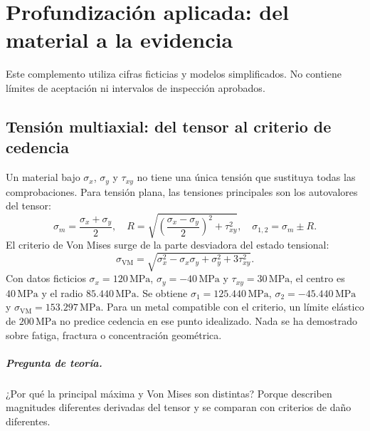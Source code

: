 \chapter{Profundización aplicada: del material a la evidencia}
\label{ch:matmo-profundizacion}
\noindent Este complemento utiliza cifras ficticias y modelos simplificados. No contiene límites de aceptación ni intervalos de inspección aprobados.

\section{Tensión multiaxial: del tensor al criterio de cedencia}
Un material bajo $\sigma_x$, $\sigma_y$ y $\tau_{xy}$ no tiene una única tensión que sustituya todas las comprobaciones. Para tensión plana, las tensiones principales son los autovalores del tensor:
\begin{equation}
\sigma_m=\frac{\sigma_x+\sigma_y}{2},\quad
R=\sqrt{\left(\frac{\sigma_x-\sigma_y}{2}\right)^2+\tau_{xy}^2},\quad
\sigma_{1,2}=\sigma_m\pm R.
\label{eq:av-matmo-mohr}
\end{equation}
El criterio de Von Mises surge de la parte desviadora del estado tensional:
\begin{equation}
\sigma_{\mathrm{VM}}=\sqrt{\sigma_x^2-\sigma_x\sigma_y+\sigma_y^2+3\tau_{xy}^2}.
\label{eq:av-matmo-mises}
\end{equation}
{Con datos ficticios $\sigma_x=120\,\mathrm{MPa}$, $\sigma_y=-40\,\mathrm{MPa}$ y $\tau_{xy}=30\,\mathrm{MPa}$, el centro es $40\,\mathrm{MPa}$ y el radio $85.440\,\mathrm{MPa}$. Se obtiene $\sigma_1=125.440\,\mathrm{MPa}$, $\sigma_2=-45.440\,\mathrm{MPa}$ y $\sigma_{\mathrm{VM}}=153.297\,\mathrm{MPa}$. Para un metal compatible con el criterio, un límite elástico de $200\,\mathrm{MPa}$ no predice cedencia en ese punto idealizado. Nada se ha demostrado sobre fatiga, fractura o concentración geométrica.}
\paragraph{Pregunta de teoría.} ¿Por qué la principal máxima y Von Mises son distintas? Porque describen magnitudes diferentes derivadas del tensor y se comparan con criterios de daño diferentes.

